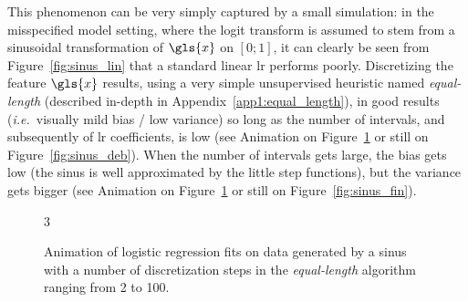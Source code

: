This phenomenon can be very simply captured by a small simulation: in the misspecified model setting, where the logit transform is assumed to stem from a sinusoidal transformation of $\gls{x}$ on $[0;1]$, it can clearly be seen from Figure~\ref{fig:sinus_lin} that a standard linear \gls{lr} performs poorly. Discretizing the feature $\gls{x}$ results, using a very simple unsupervised heuristic named \textit{equal-length} (described in-depth in Appendix~\ref{app1:equal_length}), in good results (\textit{i.e.}\ visually mild bias / low variance) so long as the number of intervals, and subsequently of \gls{lr} coefficients, is low (see Animation on Figure~\ref{fig:anim_sinus} or still on Figure~\ref{fig:sinus_deb}). When the number of intervals gets large, the bias gets low (the sinus is well approximated by the little step functions), but the variance gets bigger (see Animation on Figure~\ref{fig:anim_sinus} or still on Figure~\ref{fig:sinus_fin}).



\begin{figure}[!ht]
\begin{animateinline}[poster=first, controls=all, palindrome, autopause, autoresume, width=\textwidth, height=7cm]{3}
%
\end{animateinline}
\caption{\label{fig:anim_sinus} Animation of logistic regression fits on data generated by a sinus with a number of discretization steps in the \textit{equal-length} algorithm ranging from 2 to 100.}
\end{figure}

